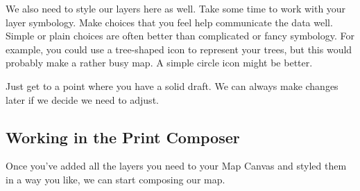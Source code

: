 \documentclass[
]{article}
\begin{document}
We also need to style our layers here as well. Take some time to work with your layer symbology. Make choices that you feel help communicate the data well. Simple or plain choices are often better than complicated or fancy symbology. For example, you could use a tree-shaped icon to represent your trees, but this would probably make a rather busy map. A simple circle icon might be better.

Just get to a point where you have a solid draft. We can always make changes later if we decide we need to adjust.

\hypertarget{working-in-the-print-composer}{%
\subsection{Working in the Print Composer}\label{working-in-the-print-composer}}

Once you've added all the layers you need to your Map Canvas and styled them in a way you like, we can start composing our map.
\end{document}
